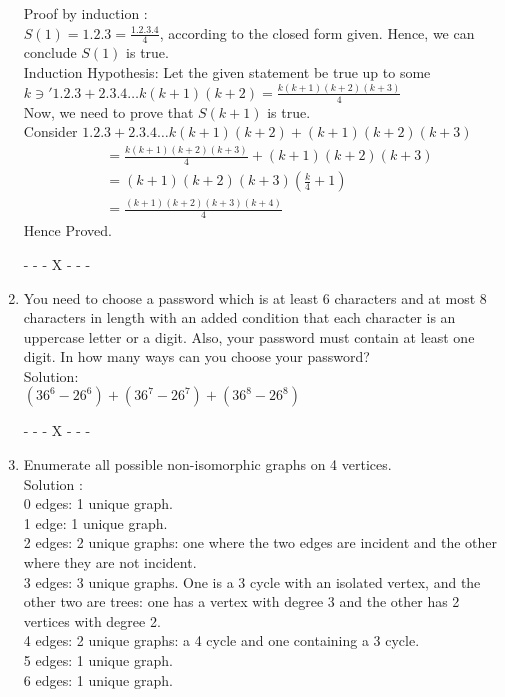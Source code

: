 \documentclass{article}
\begin{document}
\begin{enumerate}
 Proof by induction : \\
 $S(1) = 1.2.3 = \frac{1.2.3.4}{4}$, according to the closed form given. Hence, we can conclude $S(1)$ is true. \\
 
 Induction Hypothesis: Let the given statement be true up to some $k \ni' 1.2.3 + 2.3.4 \dots k(k+1)(k+2) = \frac{k(k+1)(k+2)(k+3)}{4}$\\
 
 Now, we need to prove that  $S(k+1)$ is true.\\
 Consider $1.2.3 + 2.3.4 \dots k(k+1)(k+2) + (k+1)(k+2)(k+3)$
 \begin{align*}
 &= \frac{k(k+1)(k+2)(k+3)}{4} + (k+1)(k+2)(k+3)\\
 &= (k+1)(k+2)(k+3)\left(\frac{k}{4} +1\right)\\
 &=  \frac{(k+1)(k+2)(k+3)(k+4)}{4}
 \end{align*}
Hence Proved.\\ 
 
 
 \begin{center}
- - - X - - -
\end{center}
 
 \item You need to choose a password which is at least 6 characters and at most 8 characters in length with an added condition that each character is an uppercase letter or a digit. Also, your password must contain at least one digit. In how many ways can you choose your password?\\ 
 Solution: \\
 $(36^6 - 26^6) + (36^7 - 26^7) +(36^8 - 26^8) $
 
\begin{center}
- - - X - - -
\end{center}
 \item Enumerate all possible non-isomorphic graphs on 4 vertices. \\ 
 Solution : \\ 
 0 edges: 1 unique graph.\\
1 edge: 1 unique graph.\\ 
2 edges: 2 unique graphs: one where the two edges are incident and the other where they are not incident. \\ 
3 edges: 3 unique graphs. One is a 3 cycle with an isolated vertex, and the other two are trees: one has a vertex with degree 3 and the other has 2 vertices with degree 2.\\ 
4 edges: 2 unique graphs: a 4 cycle and one containing a 3 cycle.\\ 
5 edges: 1 unique graph.\\ 
6 edges: 1 unique graph.

\end{enumerate}
\end{document}
